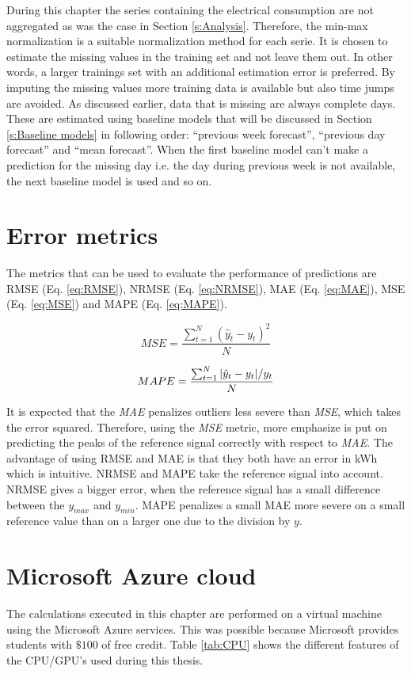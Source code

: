 During this chapter the series containing the electrical consumption are not aggregated as was the case in Section \ref{s:Analysis}. Therefore, the min-max normalization is a suitable normalization method for each serie. It is chosen to estimate the missing values in the training set and not leave them out. In other words, a larger trainings set with an additional estimation error is preferred. By imputing the missing values more training data is available but also time jumps are avoided. As discussed earlier, data that is missing are always complete days. These are estimated using baseline models that will be discussed in Section \ref{s:Baseline models} in following order: ``previous week forecast'', ``previous day forecast'' and ``mean forecast''. When the first baseline model can't make a prediction for the missing day i.e. the day during previous week is not available, the next baseline model is used and so on.\\

\section{Error metrics}
The metrics that can be used to evaluate the performance of predictions are  RMSE (Eq. \ref{eq:RMSE}), NRMSE (Eq. \ref{eq:NRMSE}),  MAE  (Eq. \ref{eq:MAE}),  MSE (Eq. \ref{eq:MSE}) and MAPE (Eq. \ref{eq:MAPE}).

\begin{equation}\label{eq:MSE}
	MSE = \frac{\sum_{t=1}^{N}(\hat{y}_t-y_t)^2}{N}
\end{equation}

\begin{equation}\label{eq:MAPE}
	MAPE = \frac{\sum_{t=1}^{N}\abs{\hat{y}_t-y_t}/y_t}{N}
\end{equation}


It is expected that the \textit{MAE} penalizes outliers less severe than \textit{MSE}, which takes the error squared. Therefore, using the \textit{MSE} metric, more emphasize is put on predicting the peaks of the reference signal correctly with respect to \textit{MAE}. The advantage of using  RMSE  and MAE  is that they both have an error in kWh which is intuitive.  NRMSE  and  MAPE  take the reference signal into account. NRMSE  gives a bigger error, when the reference signal has a small difference between the $ y_{max} $ and $ y_{min} $.  MAPE  penalizes a small MAE more severe on a small reference value than on a larger one due to the division by $ y $.


\section{Microsoft Azure cloud}
The calculations executed in this chapter are performed on a virtual machine using the Microsoft Azure services. This was possible because Microsoft provides students with $ \$ 100 $ of free credit. Table \ref{tab:CPU} shows the different features of the CPU/GPU's used during this thesis. 

